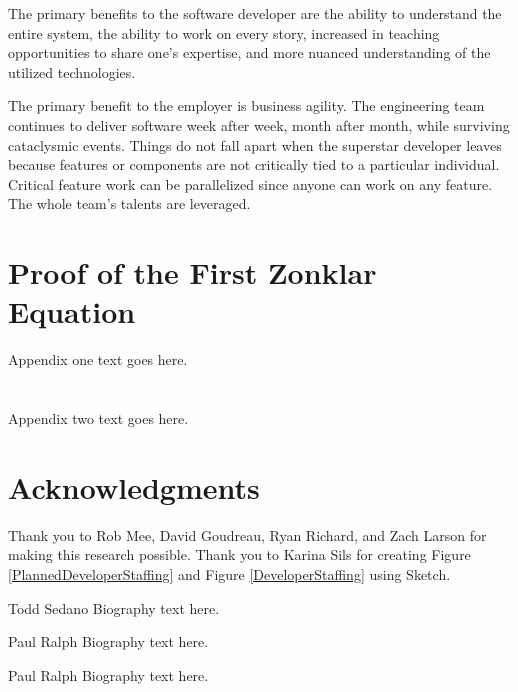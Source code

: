 The primary benefits to the software developer are the ability to understand the entire system, the ability to work on every story, increased in teaching opportunities to share one’s expertise, and more nuanced understanding of the utilized technologies. 

The primary benefit to the employer is business agility. The engineering team continues to deliver software week after week, month after month, while surviving cataclysmic events. Things do not fall apart when the superstar developer leaves because features or components are not critically tied to a particular individual. Critical feature work can be parallelized since anyone can work on any feature.  The whole team’s talents are leveraged.


\appendices
\section{Proof of the First Zonklar Equation}
Appendix one text goes here.

\section{}
Appendix two text goes here.

\section*{Acknowledgments}
Thank you to Rob Mee, David Goudreau, Ryan Richard, and Zach Larson for making this research possible. Thank you to Karina Sils for creating Figure \ref{PlannedDeveloperStaffing} and Figure \ref{DeveloperStaffing} using Sketch.

\ifCLASSOPTIONcaptionsoff
  \newpage
\fi


 

\begin{IEEEbiography}{Todd Sedano}
Biography text here.
\end{IEEEbiography}

\begin{IEEEbiographynophoto}{Paul Ralph}
Biography text here.
\end{IEEEbiographynophoto}

\begin{IEEEbiography}{Paul Ralph}
Biography text here.
\end{IEEEbiography}

